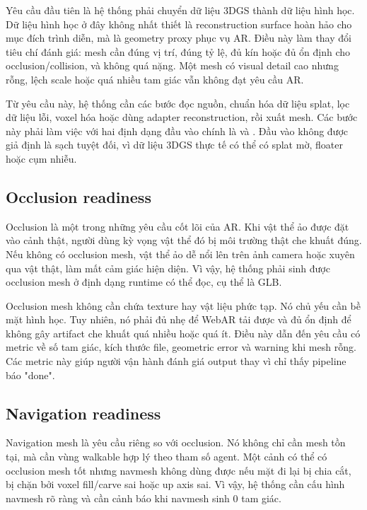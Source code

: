 Yêu cầu đầu tiên là hệ thống phải chuyển dữ liệu 3DGS thành dữ liệu hình học. Dữ liệu hình học ở đây không nhất thiết là reconstruction surface hoàn hảo cho mục đích trình diễn, mà là geometry proxy phục vụ AR. Điều này làm thay đổi tiêu chí đánh giá: mesh cần đúng vị trí, đúng tỷ lệ, đủ kín hoặc đủ ổn định cho occlusion/collision, và không quá nặng. Một mesh có visual detail cao nhưng rỗng, lệch scale hoặc quá nhiều tam giác vẫn không đạt yêu cầu AR.

Từ yêu cầu này, hệ thống cần các bước đọc nguồn, chuẩn hóa dữ liệu splat, lọc dữ liệu lỗi, voxel hóa hoặc dùng adapter reconstruction, rồi xuất mesh. Các bước này phải làm việc với hai định dạng đầu vào chính là  và . Đầu vào không được giả định là sạch tuyệt đối, vì dữ liệu 3DGS thực tế có thể có splat mờ, floater hoặc cụm nhiễu.

\subsection{Occlusion readiness}

Occlusion là một trong những yêu cầu cốt lõi của AR. Khi vật thể ảo được đặt vào cảnh thật, người dùng kỳ vọng vật thể đó bị môi trường thật che khuất đúng. Nếu không có occlusion mesh, vật thể ảo dễ nổi lên trên ảnh camera hoặc xuyên qua vật thật, làm mất cảm giác hiện diện. Vì vậy, hệ thống phải sinh được occlusion mesh ở định dạng runtime có thể đọc, cụ thể là GLB.

Occlusion mesh không cần chứa texture hay vật liệu phức tạp. Nó chủ yếu cần bề mặt hình học. Tuy nhiên, nó phải đủ nhẹ để WebAR tải được và đủ ổn định để không gây artifact che khuất quá nhiều hoặc quá ít. Điều này dẫn đến yêu cầu có metric về số tam giác, kích thước file, geometric error và warning khi mesh rỗng. Các metric này giúp người vận hành đánh giá output thay vì chỉ thấy pipeline báo "done".

\subsection{Navigation readiness}

Navigation mesh là yêu cầu riêng so với occlusion. Nó không chỉ cần mesh tồn tại, mà cần vùng walkable hợp lý theo tham số agent. Một cảnh có thể có occlusion mesh tốt nhưng navmesh không dùng được nếu mặt đi lại bị chia cắt, bị chặn bởi voxel fill/carve sai hoặc up axis sai. Vì vậy, hệ thống cần cấu hình navmesh rõ ràng và cần cảnh báo khi navmesh sinh 0 tam giác.

